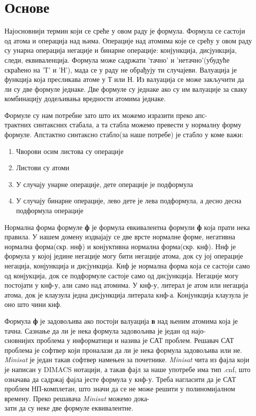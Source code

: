 \documentclass[a4paper,10pt]{article}
\begin{document}
\section{Основе}
\label{sec:osnove}

Најосновнији термин који се среће у овом раду је формула. Формула се састоји од атома и операција над њима. Операције над атомима које се срећу у овом раду су унарна операција негације и бинарне операције: конјункција, дисјункција, следи, еквиваленција. Формула може садржати 'тачно' и 'нетачно'(убудуће скраћено на 'Т' и 'Н'), мада се у раду не обрађују ти случајеви. Валуација је функција која пресликава атоме у Т или Н. Из валуација се може закључити да ли су две формуле једнаке. Две формуле су једнаке ако су им валуације за сваку комбинацију додељивања вредности атомима једнаке.

Формуле су нам потребне зато што их можемо изразити преко апс-\\трактних синтаксних стабала, а та стабла можемо превести у нормалну форму формуле. Апстактно синтаксно стабло(за наше потребе) је стабло у коме важи:
\begin{enumerate}
\item{Чворови осим листова су операције}
\item{Листови су атоми}
\item{У случају унарне операције, дете операције је подформула}
\item{У случају бинарне операције, лево дете је лева подформула, а десно десна подформула операције}
\end{enumerate}

Нормална форма формуле \textbf{ф} је формула евкивалентна формули \textbf{ф} која прати нека правила. У нашем домену издвајају се две врсте нормалне форме, негативна нормална форма(скр. ннф) и конјуктивна нормална форма(скр. кнф). Ннф је формула у којој једине негације могу бити негације атома, док су јој операције негација, конјункција и дисјункција. Кнф је нормална форма која се састоји само од конјукција, док се подформуле састоје само од дисјункција. Негације могу постојати у кнф-у, али само над атомима. У кнф-у, литерал је атом или негација атома, док је клаузула једна дисјункција литерала кнф-а. Конјункција клаузула је оно што чини кнф.

Формула \textbf{ф} је задовољива ако постоји валуација \textbf{в} над њеним атомима која је тачна. Сазнање да ли је нека формула задовољива је један од најо-\\сновнијих проблема у информатици и назива је САТ проблем. Решавач САТ проблема је софтвер који проналази да ли је нека формула задовољива или не. \textit{Minisat} је један такав софтвер намењен за почетнике. \textit{Minisat} чита из фајла који је написан у DIMACS нотацији, а такав фајл за наше употребе има тип .cnf, што означава да садржај фајла јесте формула у кнф-у. Треба нагласити да је САТ проблем НП-комплетан, што значи да се не може решити у полиномијалном времену. Преко решавача \textit{Minisat} можемо дока-\\зати да су неке две формуле еквивалентне.
\end{document}
